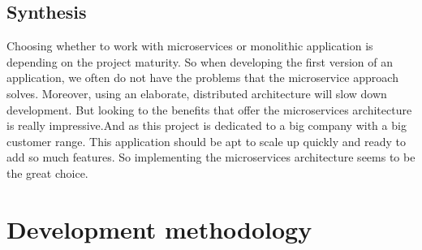 \subsection{Synthesis}
\label{subsec:subsec01}
Choosing whether to work with microservices or monolithic application is depending on the project maturity. So when developing the first
 version of an application, we often do not have the problems that the microservice approach solves. 
 Moreover, using an elaborate, distributed architecture will slow down development. But looking to the benefits that offer the microservices architecture is
 really impressive.And as this project is dedicated to a big company with a big customer range. This application should be apt to scale up quickly and
 ready to add so much features. So implementing the microservices architecture seems to be the great choice.


\section{Development methodology}
\label{subsec:subsec01}

